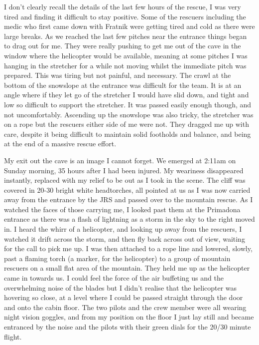     I don’t clearly recall the details of the last few hours of the rescue, I was very tired and finding it difficult to stay positive. Some of the rescuers including the medic who first came down with Fratnik were getting tired and cold as there were large breaks. As we reached the last few pitches near the entrance things began to drag out for me. They were really pushing to get me out of the cave in the window where the helicopter would be available, meaning at some pitches I was hanging in the stretcher for a while not moving whilst the immediate pitch was prepared. This was tiring but not painful, and necessary. The crawl at the bottom of the snowslope at the entrance was difficult for the team. It is at an angle where if they let go of the stretcher I would have slid down, and tight and low so difficult to support the stretcher. It was passed easily enough though, and not uncomfortably. Ascending up the snowslope was also tricky, the stretcher was on a rope but the rescuers either side of me were not. They dragged me up with care, despite it being difficult to maintain solid footholds and balance, and being at the end of a massive rescue effort.

    My exit out the cave is an image I cannot forget. We emerged at 2:11am on Sunday morning, 35 hours after I had been injured. My weariness disappeared instantly, replaced with my relief to be out as I took in the scene. The cliff was covered in 20-30 bright white headtorches, all pointed at us as I was now carried away from the entrance by the JRS and passed over to the mountain rescue. As I watched the faces of those carrying me, I looked past them at the Primadona entrance as there was a flash of lightning as a storm in the sky to the right moved in. I heard the whirr of a helicopter, and looking up away from the rescuers, I watched it drift across the storm, and then fly back across out of view, waiting for the call to pick me up. I was then attached to a rope line and lowered, slowly, past a flaming torch (a marker, for the helicopter) to a group of mountain rescuers on a small flat area of the mountain. They held me up as the helicopter came in towards us. I could feel the force of the air buffeting us and the overwhelming noise of the blades but I didn’t realise that the helicopter was hovering so close, at a level where I could be passed straight through the door and onto the cabin floor. The two pilots and the crew member were all wearing night vision goggles, and from my position on the floor I just lay still and became entranced by the noise and the pilots with their green dials for the 20/30 minute flight.

